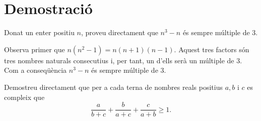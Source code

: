\section{Demostraci\'{o}}

\begin{exercici}
Donat un enter positiu $n$, proveu directament que $n^{3}-n$ \'{e}s sempre
m\'{u}ltiple de 3.
\end{exercici}

\begin{solucio}
Observa primer que $n(n^{2}-1)=n(n+1)(n-1)$. Aquest tres factors s\'{o}n tres
nombres naturals consecutius i, per tant, un d'ells ser\`{a} un m\'{u}ltiple
de 3. Com a conseq\"{u}\`{e}ncia $n^{3}-n$ \'{e}s sempre m\'{u}ltiple de 3.
\end{solucio}

\begin{exercici}
Demostreu directament que per a cada terna de nombres reals positius $a,b$ i
$c$ es compleix que%
\[
\frac{a}{b+c}+\frac{b}{a+c}+\frac{c}{a+b}\geq1\text{.}%
\]

\end{exercici}

